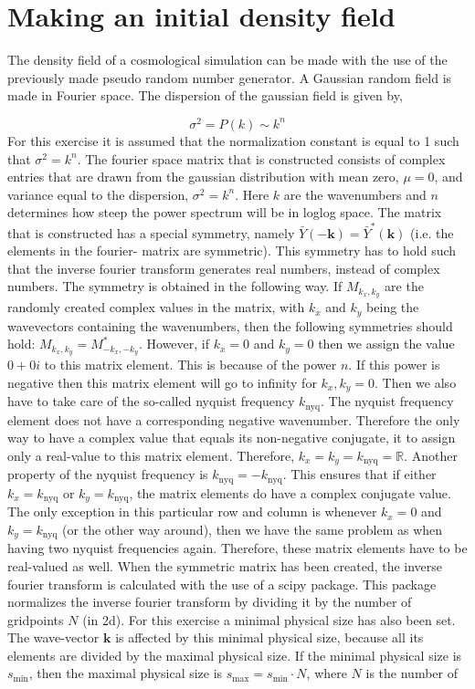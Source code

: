 
\section{Making an initial density field}

The density field of a cosmological simulation can be made with the use of the previously made pseudo random number generator. A Gaussian random field is made in Fourier space. The dispersion of the gaussian field is given by,

\begin{equation*}
\sigma^2 = P(k) \sim k^n
\end{equation*}
For this exercise it is assumed that the normalization constant is equal to 1 such that $\sigma^2 = k^n$. The fourier space matrix that is constructed consists of complex entries that are drawn from the gaussian distribution with mean zero, $\mu = 0$, and variance equal to the dispersion, $\sigma^2 = k^n$. Here $k$ are the wavenumbers and $n$ determines how steep the power spectrum will be in loglog space. The matrix that is constructed has a special symmetry, namely $\bar{Y}(-\textbf{k}) = \bar{Y}^*(\textbf{k})$ (i.e. the elements in the fourier- matrix are symmetric). This symmetry has to hold such that the inverse fourier transform generates real numbers, instead of complex numbers. The symmetry is obtained in the following way. If $M_{k_x,k_y}$ are the randomly created complex values in the matrix, with $k_x$ and $k_y$ being the wavevectors containing the wavenumbers, then the following symmetries should hold: $M_{k_x,k_y} = M_{-k_x,-k_y}^*$. However, if $k_x = 0$ and $k_y = 0$ then we assign the value $0 + 0i$ to this matrix element. This is because of the power $n$. If this power is negative then this matrix element will go to infinity for $k_x,k_y = 0$. Then we also have to take care of the so-called nyquist frequency $k_{\mathrm{nyq}}$. The nyquist frequency element does not have a corresponding negative wavenumber. Therefore the only way to have a complex value that equals its non-negative conjugate, it to assign only a real-value to this matrix element. Therefore, $k_x = k_y = k_{\mathrm{nyq}} = \mathbb{R}$. Another property of the nyquist frequency is $k_{\mathrm{nyq}} = -k_{\mathrm{nyq}}$. This ensures that if either $k_x = k_{\mathrm{nyq}}$ or $k_y = k_{\mathrm{nyq}}$, the matrix elements do have a complex conjugate value. The only exception in this particular row and column is whenever $k_x = 0$ and $k_y = k_{\mathrm{nyq}}$ (or the other way around), then we have the same problem as when having two nyquist frequencies again. Therefore, these matrix elements have to be real-valued as well. When the symmetric matrix has been created, the inverse fourier transform is calculated with the use of a scipy package. This package normalizes the inverse fourier transform by dividing it by the number of gridpoints $N$ (in 2d). For this exercise a minimal physical size has also been set. The wave-vector $\textbf{k}$ is affected by this minimal physical size, because all its elements are divided by the maximal physical size. If the minimal physical size is $s_{\mathrm{min}}$, then the maximal physical size is $s_{\mathrm{max}} = s_{\mathrm{min}}\cdot N$, where $N$ is the number of 